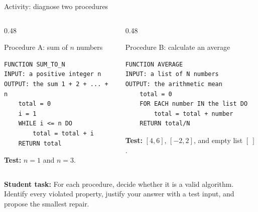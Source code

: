 \documentclass[aspectratio=169]{beamer}
\begin{document}
\begin{frame}[fragile]{Activity: diagnose two procedures}
  \begin{columns}[T]
    \begin{column}{0.48\textwidth}
      \begin{block}{Procedure A: sum of $n$ numbers}
\begin{lstlisting}[style=pseudo,basicstyle=\ttfamily\small]
FUNCTION SUM_TO_N
INPUT: a positive integer n
OUTPUT: the sum 1 + 2 + ... + n
    total = 0
    i = 1
    WHILE i <= n DO
        total = total + i
    RETURN total
\end{lstlisting}
        \textbf{Test:} $n=1$ and $n=3$.
      \end{block}
    \end{column}
    \begin{column}{0.48\textwidth}
      \begin{exampleblock}{Procedure B: calculate an average}
\begin{lstlisting}[style=pseudo,basicstyle=\ttfamily\small]
FUNCTION AVERAGE
INPUT: a list of N numbers
OUTPUT: the arithmetic mean
    total = 0
    FOR EACH number IN the list DO
        total = total + number
    RETURN total/N
\end{lstlisting}
        \textbf{Test:} $[4,6]$, $[-2,2]$, and empty list $[\ ]$.
      \end{exampleblock}
    \end{column}
  \end{columns}
  \vspace{0.25em}
   
    {\bf Student task:} For each procedure, decide whether it is a valid algorithm. Identify every violated property, justify your answer with a test input, and propose the
    smallest repair.
\end{frame}
\end{document}
